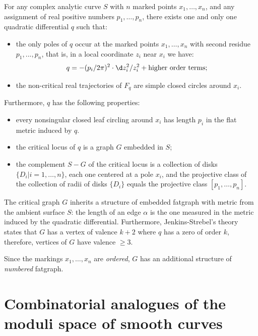 \begin{theorem} 
  \label{thm:JS}
  For any complex analytic curve $S$ with $n$ marked points $x_1, \ldots,
  x_n$, and any assignment of real positive numbers $p_1, \ldots, p_n$,
  there exists one and only one quadratic differential $q$ such that:
  \begin{itemize}
  \item the only poles of $q$ occur at the marked points $x_1, \ldots, x_n$
    with second residue $p_1, ..., p_n$, that is, in a local
    coordinate $z_i$ near $x_i$ we have:
    \begin{equation*}
      q = -(p_i/2\pi)^2 \cdot \d z_i^2 / z_i^2 + \text{higher order terms};
    \end{equation*}
  \item the non-critical real trajectories of $F_q$ are simple closed
    circles around $x_i$.
  \end{itemize}
  Furthermore, $q$ has the following properties:
  \begin{itemize}
  \item every nonsingular closed leaf circling around $x_i$ has length
    $p_i$ in the flat metric induced by $q$.
  \item the critical locus of $q$ is a graph $G$ embedded in $S$;
  \item the complement $S - G$ of the critical locus is a collection
    of disks $\{D_i | i=1,\ldots,n\}$, each one centered at a pole $x_i$, and
    the projective class of the collection of radii of disks $\{D_i\}$
    equals the projective class $[p_1, \ldots, p_n]$.
  \end{itemize}
\end{theorem}
The critical graph $G$ inherits a structure of embedded fatgraph
with metric from the ambient surface $S$: the length of an edge $\alpha$ is
the one measured in the metric induced by the quadratic differential.
Furthermore, Jenkins-Strebel's theory states that $G$ has a vertex of
valence $k+2$ where $q$ has a zero of order $k$, therefore, vertices
of $G$ have valence $\geq3$. 

Since the markings $x_1, \ldots, x_n$ are \emph{ordered}, $G$ has an
additional structure of \emph{numbered} fatgraph.



\section[Combinatorial moduli space of curves]
  {Combinatorial analogues of the moduli space of smooth curves}
\label{sec:mgn-comb}

